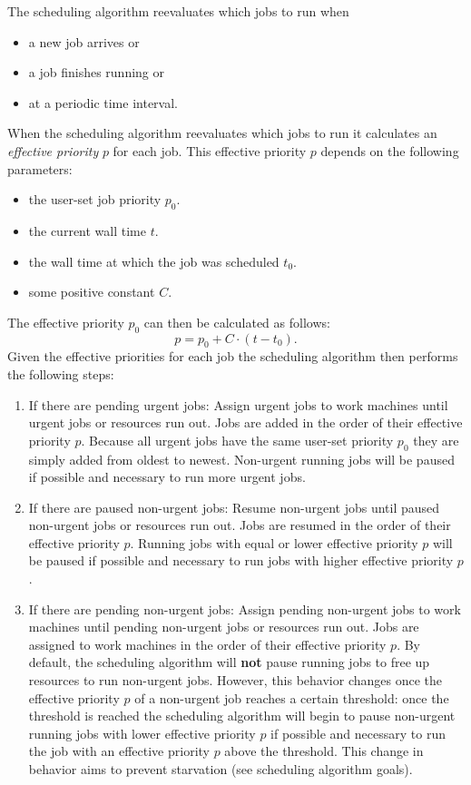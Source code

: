 The scheduling algorithm reevaluates which jobs to run when
\begin{itemize}
  \item a new job arrives or
  \item a job finishes running or
  \item at a periodic time interval.
\end{itemize}
When the scheduling algorithm reevaluates which jobs to run it calculates an \textit{effective priority} $p$ for each job.
This effective priority $p$ depends on the following parameters:
\begin{itemize}
  \item the user-set job priority $p_0$.
  \item the current wall time $t$.
  \item the wall time at which the job was scheduled $t_0$.
  \item some positive constant $C$.
\end{itemize}
The effective priority $p_0$ can then be calculated as follows:
\begin{equation}
p = p_0 + C \cdot (t - t_0).
\end{equation}
Given the effective priorities for each job the scheduling algorithm then performs the following steps:
\begin{enumerate}
  \item If there are pending urgent jobs:
  Assign urgent jobs to work machines until urgent jobs or resources run out.
  Jobs are added in the order of their effective priority $p$.
  Because all urgent jobs have the same user-set priority $p_0$ they are simply added from oldest to newest.
  Non-urgent running jobs will be paused if possible and necessary to run more urgent jobs.
  \item If there are paused non-urgent jobs:
  Resume non-urgent jobs until paused non-urgent jobs or resources run out.
  Jobs are resumed in the order of their effective priority $p$.
  Running jobs with equal or lower effective priority $p$ will be paused if possible and necessary to run jobs with higher effective priority $p$.
  \item If there are pending non-urgent jobs:
  Assign pending non-urgent jobs to work machines until pending non-urgent jobs or resources run out.
  Jobs are assigned to work machines in the order of their effective priority $p$.
  By default, the scheduling algorithm will \textbf{not} pause running jobs to free up resources to run non-urgent jobs.
  However, this behavior changes once the effective priority $p$ of a non-urgent job reaches a certain threshold:
  once the threshold is reached the scheduling algorithm will begin to pause non-urgent running jobs with lower effective priority $p$ if possible and necessary to run the job with an effective priority $p$ above the threshold.
  This change in behavior aims to prevent starvation (see scheduling algorithm goals).
\end{enumerate}
